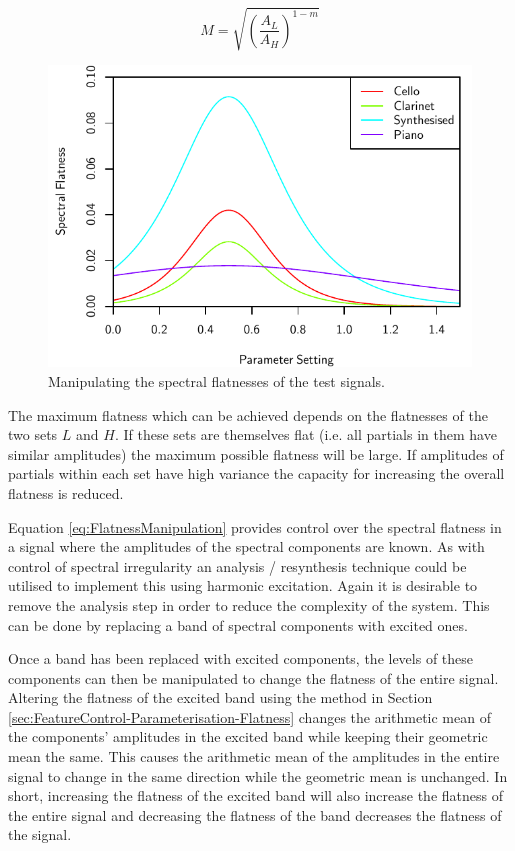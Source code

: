 		\begin{equation}
			M = \sqrt{ \left( \frac{A_L}{A_H} \right) ^{1 - m}}
			\label{eq:FlatnessControlParameter}
		\end{equation}

		\begin{figure}[h!]
			\centering
			\includegraphics{chapter6/Images/MoveFlatnesses.pdf}
			\caption{Manipulating the spectral flatnesses of the test signals.}
			\label{fig:MoveFlatnesses}
		\end{figure}

		The maximum flatness which can be achieved depends on the flatnesses of the two sets $L$ and $H$.  If these
		sets are themselves flat (i.e. all partials in them have similar amplitudes) the maximum possible flatness
		will be large. If amplitudes of partials within each set have high variance the capacity for increasing the
		overall flatness is reduced.

		Equation \ref{eq:FlatnessManipulation} provides control over the spectral flatness in a signal where the
		amplitudes of the spectral components are known. As with control of spectral irregularity an analysis /
		resynthesis technique could be utilised to implement this using harmonic excitation.  Again it is desirable
		to remove the analysis step in order to reduce the complexity of the system.  This can be done by replacing
		a band of spectral components with excited ones.

		Once a band has been replaced with excited components, the levels of these components can then be
		manipulated to change the flatness of the entire signal. Altering the flatness of the excited band using
		the method in Section \ref{sec:FeatureControl-Parameterisation-Flatness} changes the arithmetic mean of the
		components' amplitudes in the excited band while keeping their geometric mean the same. This causes the
		arithmetic mean of the amplitudes in the entire signal to change in the same direction while the geometric
		mean is unchanged. In short, increasing the flatness of the excited band will also increase the flatness of
		the entire signal and decreasing the flatness of the band decreases the flatness of the signal.

